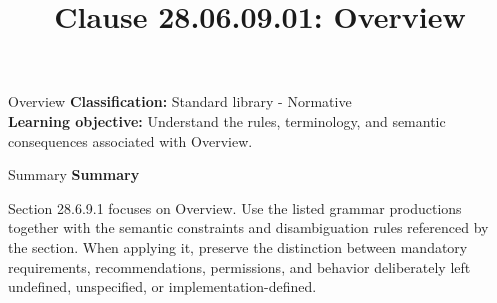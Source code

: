 \documentclass[10pt,letterpaper]{article}
\title{Clause 28.06.09.01: Overview}
\author{}
\date{}
\begin{document}
\maketitle
\begin{CornellOverviewBox}{Overview}
\textbf{Classification:} Standard library - Normative\\[2pt]
\textbf{Learning objective:} Understand the rules, terminology, and semantic consequences associated with Overview.
\end{CornellOverviewBox}\begin{CornellSummaryBox}{Summary}
{\sffamily\bfseries\color{Accent} Summary}\par\vspace{3pt}Section 28.6.9.1 focuses on Overview. Use the listed grammar productions together with the semantic constraints and disambiguation rules referenced by the section. When applying it, preserve the distinction between mandatory requirements, recommendations, permissions, and behavior deliberately left undefined, unspecified, or implementation-defined.
\end{CornellSummaryBox}
\end{document}
